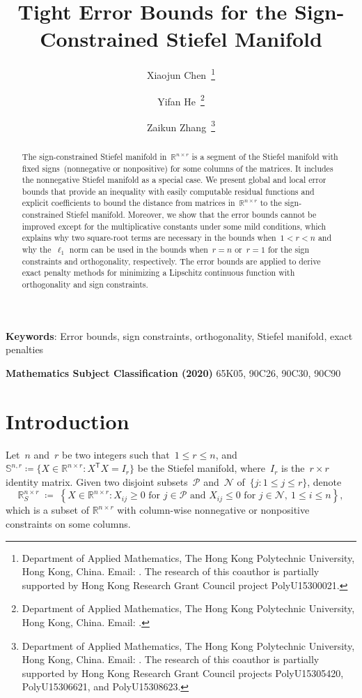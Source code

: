 \documentclass[11pt,a4paper]{article}  %
\title{Tight Error Bounds for the Sign-Constrained Stiefel Manifold}
\author{Xiaojun Chen~\thanks{Department of Applied Mathematics, The Hong Kong Polytechnic University,
        Hong Kong, China. Email: \email{maxjchen@polyu.edu.hk}.
    The research of this coauthor is partially supported by Hong Kong Research Grant Council project PolyU15300021.}
    \and Yifan He~\thanks{Department of Applied Mathematics, The Hong Kong Polytechnic University, Hong
        Kong, China. Email: \email{doublefan.he@connect.polyu.hk}.}
     \and Zaikun Zhang~\thanks{Department of Applied Mathematics, The Hong Kong Polytechnic University,
         Hong Kong, China. Email: \email{zaikun.zhang@polyu.edu.hk}.
             The research of this coauthor is partially supported by Hong Kong Research
        Grant Council projects PolyU15305420, PolyU15306621, and PolyU15308623.}
        }
\theoremstyle{definition}
\newcommand{\RR}{\mathbb{R}}
\newcommand{\col}{r}
\newcommand{\stf}[1]{\mathbb{S}^{#1}}
\newcommand{\trs}{{\scriptstyle{\mathsf{T}}}}
\newcommand{\tsign}{{\scriptscriptstyle{S}}}
\newcommand{\posset}{\mathcal{P}}
\newcommand{\negset}{\mathcal{N}}
\begin{document}
\maketitle


\begin{abstract}
The sign-constrained Stiefel manifold in~$\RR^{n\times \col}$ is
a segment of
the Stiefel manifold with fixed signs~(nonnegative or nonpositive) for some columns of the matrices.
It includes the nonnegative Stiefel manifold as a special case.
We present global and local error bounds that provide an inequality with easily computable
residual functions and explicit coefficients to bound the distance from matrices
in~$\RR^{n\times \col}$ to the sign-constrained Stiefel manifold.
Moreover,
we show that the error bounds cannot be improved except for the multiplicative constants under some mild conditions, which explains why two
square-root terms are necessary in the bounds when~$1<\col<n$ and why the~$\ell_1$ norm can be used in
the bounds when~$\col=n$ or~$\col=1$ for the sign constraints and orthogonality, respectively.
The error bounds are applied to derive exact penalty methods for minimizing a Lipschitz continuous function with
orthogonality and sign constraints.
\end{abstract}

{\textbf{Keywords}:
Error bounds, sign constraints, orthogonality, Stiefel manifold, exact penalties
}

{\textbf{Mathematics Subject Classification (2020)} 65K05, 90C26, 90C30, 90C90}

\section{Introduction}\label{sec:inro}

Let~$n$ and~$\col$ be two integers such that~$1\le \col \le n$, and
$\stf{n,\col}\coloneqq\{ X \in \RR^{n\times \col} \mathrel{:} X^\trs X = I_\col \}$ be the
Stiefel manifold, where~$I_\col$ is the~$\col \times \col$ identity matrix.
Given two disjoint subsets~$\posset$ and~$\negset$ of~$\{j\mathrel{:} 1\le j \le \col\}$,
denote
\begin{equation*}
    \RR^{n\times \col}_{\tsign}
    \;\coloneqq\; \left\{ X \in \RR^{n\times \col} \mathrel{:} X_{ij} \ge 0 \text{ for } j \in \posset
        \text{ and }
    X_{ij} \le 0 \text{ for } j \in \negset, ~ 1\le i \le n \right\},
\end{equation*}
which is a subset of $\RR^{n\times \col}$ with column-wise nonnegative or nonpositive constraints on some columns.
\end{document}

